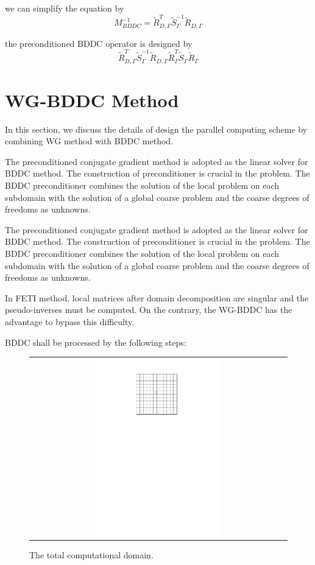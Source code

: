 we can simplify the equation by 
\begin{equation}
M_{BDDC}^{-1} = \tilde{R}_{D,\Gamma}^{T} \tilde{S}_{\Gamma}^{-1} \tilde{R}_{D, \Gamma}
\end{equation}

the preconditioned BDDC operator is designed by 
\begin{equation}
\tilde{R}_{D, \Gamma}^{T} \tilde{S}_{\Gamma}^{-1} \tilde{R}_{D, \Gamma} \tilde{R}_{\Gamma}^{T}\tilde{S}_{\Gamma}\tilde{R}_{\Gamma}
\end{equation}

\section{WG-BDDC Method}
In this section, we discuss the details of design the parallel computing scheme by combining WG method with BDDC method. 

The preconditioned conjugate gradient method is adopted as the linear solver for BDDC method. The construction of preconditioner is crucial in the problem. The BDDC preconditioner combines the solution of the local problem on each subdomain with the solution of a global coarse problem and the coarse degrees of freedoms as unknowns. 

The preconditioned conjugate gradient method is adopted as the linear solver for BDDC method. The construction of preconditioner is crucial in the problem. The BDDC preconditioner combines the solution of the local problem on each subdomain with the solution of a global coarse problem and the coarse degrees of freedoms as unknowns. 

In FETI method, local matrices after domain decomposition are singular and the pseudo-inverses must be computed. On the contrary, the WG-BDDC has the advantage to bypass this difficulty.

BDDC shall be processed by the following steps:

\begin{figure}[h]
	\centering
	\begin{tabular}{c}
		\includegraphics[width=0.5\textwidth]{./pics/domain.pdf}
	\end{tabular}
	\caption{\footnotesize The total computational domain.}\label{fig3: domain}
\end{figure}

